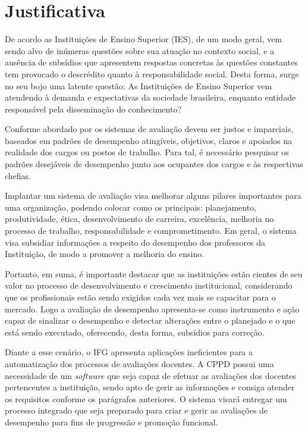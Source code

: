 \section{Justificativa}

    De acordo  as Instituições de Ensino Superior (IES), de um modo geral, vem sendo alvo de inúmeras questões sobre sua atuação no contexto social, e a ausência de subsídios que apresentem respostas concretas às questões constantes tem provocado o descrédito quanto à responsabilidade social. Desta forma, surge no seu bojo uma latente questão: As Instituições de Ensino Superior vem atendendo à demanda e expectativas da sociedade brasileira, enquanto entidade responsável pela disseminação do conhecimento? 
    
    Conforme abordado por  os sistemas de avaliação devem ser justos e imparciais, baseados em padrões de desempenho atingíveis, objetivos, claros e apoiados na realidade dos cargos ou postos de trabalho. Para tal, é necessário pesquisar os padrões desejáveis de desempenho junto aos ocupantes dos cargos e às respectivas chefias.
    
    Implantar um sistema de avaliação visa melhorar alguns pilares importantes para uma organização, podendo colocar como os principais: planejamento, produtividade, ética, desenvolvimento de carreira, excelência, melhoria no processo de trabalho, responsabilidade e comprometimento. Em geral, o sistema visa subsidiar informações a respeito do desempenho dos professores da Instituição, de modo a promover a melhoria do ensino. 

    Portanto, em suma, é importante destacar que as instituições estão cientes de seu valor no processo de desenvolvimento e crescimento institucional, considerando que os profissionais estão sendo exigidos cada vez mais se capacitar para o mercado. Logo a avaliação de desempenho apresenta-se como instrumento e ação capaz de sinalizar o desempenho e detectar alterações entre o planejado e o que está sendo executado, oferecendo, desta forma, subsídios para correção.

    Diante a esse cenário, o IFG apresenta aplicações ineficientes para a automatização dos processos de avaliações docentes. A CPPD possui uma necessidade de um \textit{software} que seja capaz de efetuar as avaliações dos docentes pertencentes a instituição, sendo apto de gerir as informações e consiga atender os requisitos conforme os parágrafos anteriores. O sistema visará entregar um processo integrado que seja preparado para criar e gerir as avaliações de desempenho para fins de progressão e promoção funcional.


